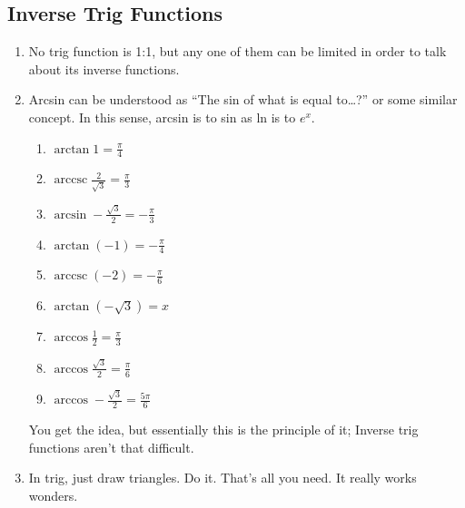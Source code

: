 \documentclass[11pt]{article}
\DeclareMathOperator{\arccsc}{arccsc}
\begin{document}
\subsection{Inverse Trig Functions}
\begin{enumerate}
	\item No trig function is 1:1, but any one of them can be limited in order 
		to talk about its inverse functions.
	\item Arcsin can be understood as ``The sin of what is equal to\dots?'' or 
		some similar concept.  In this sense, arcsin is to sin as ln is to $e^x$.  
		\begin{enumerate}
			\item $\arctan 1 = \frac{\pi}{4}$
			\item $\arccsc \frac{2}{\sqrt{3}} = \frac{\pi}{3}$
			\item $\arcsin -\frac{\sqrt{3}}{2} = -\frac{\pi}{3}$
			\item $\arctan (-1) = -\frac{\pi}{4}$
			\item $\arccsc (-2) = -\frac{\pi}{6}$
			\item $\arctan (-\sqrt{3}) = x$
			\item $\arccos \frac{1}{2} = \frac{\pi}{3}$
			\item $\arccos \frac{\sqrt {3}}{2} = \frac{\pi}{6}$
			\item $\arccos - \frac{\sqrt {3}}{2} = \frac{5\pi}{6}$
		\end{enumerate}
		You get the idea, but essentially this is the principle of it; Inverse 
		trig functions aren't that difficult.
	\item In trig, just draw triangles.  Do it.  That's all you need.  It 
		really works wonders.
\end{enumerate}
\end{document}

